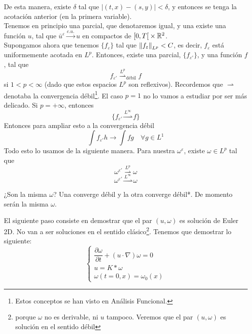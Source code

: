 De esta manera, existe $\delta$ tal que $|(t,x) - (s,y)| < \delta$, y entonces se tenga la acotación anterior (en la primera variable). \\

Tenemos en principio una parcial, que denotaremos igual, y una existe una función $u$, tal que $\bar{u}^\varepsilon \stackrel{c.u.}{\to} u$
en compactos de $\left[0, T\right[ \times \mathbb{R}^2$. \\

Supongamos ahora que tenemos $\{f_\varepsilon\}$ tal que $\left\lVert f_\varepsilon \right\rVert_{L^p} < C$, es decir, $f_\varepsilon$ está uniformemente acotada 
en $L^p$. Entonces, existe una parcial, $\{f_{\varepsilon'}\}$, y una función $f$, tal que
$$f_{\varepsilon'} \stackrel{L^p}{\rightharpoonup}_{\text{débil}} f$$ %
si $1 < p < \infty$ (dado que estos espacios $L^p$ son reflexivos). Recordemos que $\rightharpoonup$ denotaba la convergencia débil\footnote{Estos 
conceptos se han visto en Análisis Funcional.}. El caso $p=1$ no lo vamos a estudiar por ser más delicado. Si $p = +\infty$, entonces
$$\{f_{\varepsilon'} \stackrel{L^\infty}{\rightharpoonup} f\}$$ %
Entonces para ampliar esto a la convergencia débil
$$\int f_{\varepsilon'} h \rightarrow \int fg \quad \forall g \in L^1$$
Todo esto lo usamos de la siguiente manera. Para nuestra $\omega^\varepsilon$, existe $\omega \in L^p$ tal que 
$$\omega^{\varepsilon'} \stackrel{L^p}{\rightharpoonup} \omega$$ %
$$\omega^{\varepsilon'} \stackrel{L^\infty}{\rightharpoonup} \omega$$ %

\begin{ejercicio}
    ¿Son la misma $\omega$? Una converge débil y la otra converge débil*. De momento serán la misma $\omega$.
\end{ejercicio}

El siguiente paso consiste en demostrar que el par $(u, \omega)$ es solución de Euler 2D. No van a ser soluciones en el sentido clásico\footnote{
    porque $\omega$ no es derivable, ni $u$ tampoco. Veremos que el par $(u, \omega)$ es solución en el sentido débil}. Tenemos 
que demostrar lo siguiente:
\begin{equation}\label{eq:ec33}
    \begin{cases}
        \dfrac{\partial \omega}{\partial t} + (u \cdot \nabla) \omega = 0 \\
        u = K \ast \omega \\
        \omega(t=0,x) = \omega_0(x)
    \end{cases}
\end{equation}

